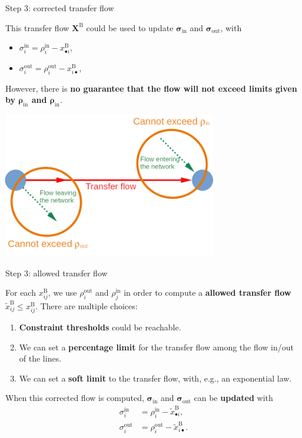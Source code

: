 \documentclass[10pt]{beamer}
\newcommand{\imp}[1]{\textbf{\color{cyan}#1}}
\begin{document}
	\begin{frame}{Step 3: corrected transfer flow}
		
		This transfer flow $\mathbf{X}^\text{B}$ could be used to update $\bm{\sigma}_\text{in}$ and $\bm{\sigma}_\text{out}$, with 
		 
		\begin{itemize}
			\item $\sigma^\text{in}_i = \rho^\text{in}_i - x^\text{B}_{\bullet i}$,
			\item $\sigma^\text{out}_i = \rho^\text{out}_i - x^\text{B}_{i \bullet}$,
		\end{itemize}
		However, there is \imp{no guarantee that the flow will not exceed limits given by $\bm{\rho}_\text{in}$ and $\bm{\rho}_\text{in}$}.
		\begin{center}
			\includegraphics[width=0.7\textwidth]{img/flow_constrained.png}
		\end{center}
	\end{frame}
	
	
	\begin{frame}{Step 3: allowed transfer flow}
		
		For each $x^\text{B}_{ij}$, we use $\rho^\text{out}_i$ and $\rho^\text{in}_j$ in order to compute a \imp{allowed transfer flow} $\widetilde{x}_{ij}^\text{B} \leq x_{ij}^\text{B}$. There are multiple choices:
		
		\begin{enumerate}
			\item \imp{Constraint thresholds} could be reachable.
			\item We can set a \imp{percentage limit} for the transfer flow among the flow in/out of the lines.
			\item We can set a \imp{soft limit} to the transfer flow, with, e.g., an exponential law.
		\end{enumerate}
		
		When this corrected flow is computed, $\bm{\sigma}_\text{in}$ and $\bm{\sigma}_\text{out}$ can be \imp{updated} with 
		\begin{align*}
			\sigma^\text{in}_i &= \rho^\text{in}_i - \widetilde{x}^\text{B}_{\bullet i}, \\	\sigma^\text{out}_i &= \rho^\text{out}_i - \widetilde{x}^\text{B}_{i \bullet}.
		\end{align*}
	\end{frame}
	
\end{document}
